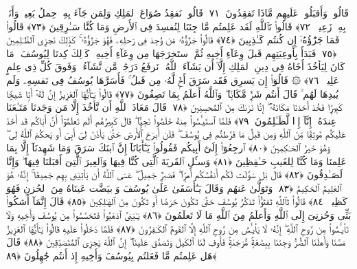  قَالُوا۟ وَأَقبَلُوا۟ عَلَيهِم مَّاذَا تَفقِدُونَ ﴿٧١﴾
 قَالُوا۟ نَفقِدُ صُوَاعَ ٱلمَلِكِ وَلِمَن جَآءَ بِهِۦ حِملُ بَعِيرٍۢ وَأَنَا۠ بِهِۦ زَعِيمٌۭ ﴿٧٢﴾
 قَالُوا۟ تَٱللَّهِ لَقَد عَلِمتُم مَّا جِئنَا لِنُفسِدَ فِى ٱلأَرضِ وَمَا كُنَّا سَـٰرِقِينَ ﴿٧٣﴾
 قَالُوا۟ فَمَا جَزَٰٓؤُهُۥٓ إِن كُنتُم كَـٰذِبِينَ ﴿٧٤﴾
 قَالُوا۟ جَزَٰٓؤُهُۥ مَن وُجِدَ فِى رَحلِهِۦ فَهُوَ جَزَٰٓؤُهُۥ ۚ كَذَٟلِكَ نَجزِى ٱلظَّـٰلِمِينَ ﴿٧٥﴾
 فَبَدَأَ بِأَوعِيَتِهِم قَبلَ وِعَآءِ أَخِيهِ ثُمَّ ٱستَخرَجَهَا مِن وِعَآءِ أَخِيهِ ۚ كَذَٟلِكَ كِدنَا لِيُوسُفَ ۖ مَا كَانَ لِيَأخُذَ أَخَاهُ فِى دِينِ ٱلمَلِكِ إِلَّآ أَن يَشَآءَ ٱللَّهُ ۚ نَرفَعُ دَرَجَٰتٍۢ مَّن نَّشَآءُ ۗ وَفَوقَ كُلِّ ذِى عِلمٍ عَلِيمٌۭ ﴿٧٦﴾
 ۞ قَالُوٓا۟ إِن يَسرِق فَقَد سَرَقَ أَخٌۭ لَّهُۥ مِن قَبلُ ۚ فَأَسَرَّهَا يُوسُفُ فِى نَفسِهِۦ وَلَم يُبدِهَا لَهُم ۚ قَالَ أَنتُم شَرٌّۭ مَّكَانًۭا ۖ وَٱللَّهُ أَعلَمُ بِمَا تَصِفُونَ ﴿٧٧﴾
 قَالُوا۟ يَـٰٓأَيُّهَا ٱلعَزِيزُ إِنَّ لَهُۥٓ أَبًۭا شَيخًۭا كَبِيرًۭا فَخُذ أَحَدَنَا مَكَانَهُۥٓ ۖ إِنَّا نَرَىٰكَ مِنَ ٱلمُحسِنِينَ ﴿٧٨﴾
 قَالَ مَعَاذَ ٱللَّهِ أَن نَّأخُذَ إِلَّا مَن وَجَدنَا مَتَـٰعَنَا عِندَهُۥٓ إِنَّآ إِذًۭا لَّظَـٰلِمُونَ ﴿٧٩﴾
 فَلَمَّا ٱستَيـَٔسُوا۟ مِنهُ خَلَصُوا۟ نَجِيًّۭا ۖ قَالَ كَبِيرُهُم أَلَم تَعلَمُوٓا۟ أَنَّ أَبَاكُم قَد أَخَذَ عَلَيكُم مَّوثِقًۭا مِّنَ ٱللَّهِ وَمِن قَبلُ مَا فَرَّطتُم فِى يُوسُفَ ۖ فَلَن أَبرَحَ ٱلأَرضَ حَتَّىٰ يَأذَنَ لِىٓ أَبِىٓ أَو يَحكُمَ ٱللَّهُ لِى ۖ وَهُوَ خَيرُ ٱلحَـٰكِمِينَ ﴿٨٠﴾
 ٱرجِعُوٓا۟ إِلَىٰٓ أَبِيكُم فَقُولُوا۟ يَـٰٓأَبَانَآ إِنَّ ٱبنَكَ سَرَقَ وَمَا شَهِدنَآ إِلَّا بِمَا عَلِمنَا وَمَا كُنَّا لِلغَيبِ حَـٰفِظِينَ ﴿٨١﴾
 وَسـَٔلِ ٱلقَريَةَ ٱلَّتِى كُنَّا فِيهَا وَٱلعِيرَ ٱلَّتِىٓ أَقبَلنَا فِيهَا ۖ وَإِنَّا لَصَـٰدِقُونَ ﴿٨٢﴾
 قَالَ بَل سَوَّلَت لَكُم أَنفُسُكُم أَمرًۭا ۖ فَصَبرٌۭ جَمِيلٌ ۖ عَسَى ٱللَّهُ أَن يَأتِيَنِى بِهِم جَمِيعًا ۚ إِنَّهُۥ هُوَ ٱلعَلِيمُ ٱلحَكِيمُ ﴿٨٣﴾
 وَتَوَلَّىٰ عَنهُم وَقَالَ يَـٰٓأَسَفَىٰ عَلَىٰ يُوسُفَ وَٱبيَضَّت عَينَاهُ مِنَ ٱلحُزنِ فَهُوَ كَظِيمٌۭ ﴿٨٤﴾
 قَالُوا۟ تَٱللَّهِ تَفتَؤُا۟ تَذكُرُ يُوسُفَ حَتَّىٰ تَكُونَ حَرَضًا أَو تَكُونَ مِنَ ٱلهَـٰلِكِينَ ﴿٨٥﴾
 قَالَ إِنَّمَآ أَشكُوا۟ بَثِّى وَحُزنِىٓ إِلَى ٱللَّهِ وَأَعلَمُ مِنَ ٱللَّهِ مَا لَا تَعلَمُونَ ﴿٨٦﴾
 يَـٰبَنِىَّ ٱذهَبُوا۟ فَتَحَسَّسُوا۟ مِن يُوسُفَ وَأَخِيهِ وَلَا تَا۟يـَٔسُوا۟ مِن رَّوحِ ٱللَّهِ ۖ إِنَّهُۥ لَا يَا۟يـَٔسُ مِن رَّوحِ ٱللَّهِ إِلَّا ٱلقَومُ ٱلكَـٰفِرُونَ ﴿٨٧﴾
 فَلَمَّا دَخَلُوا۟ عَلَيهِ قَالُوا۟ يَـٰٓأَيُّهَا ٱلعَزِيزُ مَسَّنَا وَأَهلَنَا ٱلضُّرُّ وَجِئنَا بِبِضَٰعَةٍۢ مُّزجَىٰةٍۢ فَأَوفِ لَنَا ٱلكَيلَ وَتَصَدَّق عَلَينَآ ۖ إِنَّ ٱللَّهَ يَجزِى ٱلمُتَصَدِّقِينَ ﴿٨٨﴾
 قَالَ هَل عَلِمتُم مَّا فَعَلتُم بِيُوسُفَ وَأَخِيهِ إِذ أَنتُم جَٰهِلُونَ ﴿٨٩﴾
